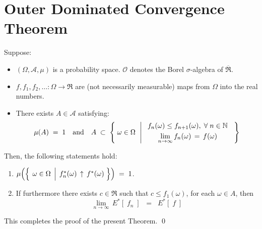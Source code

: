 

\section{Outer Dominated Convergence Theorem}
\setcounter{theorem}{0}
\setcounter{equation}{0}


\renewcommand{\theenumi}{\roman{enumi}}
\renewcommand{\labelenumi}{\textnormal{(\theenumi)}$\;\;$}


\begin{theorem}
\mbox{}\vskip 0.1cm
\noindent
Suppose:
\begin{itemize}
\item
	$(\Omega,\mathcal{A},\mu)$ is a probability space.
	$\mathcal{O}$ denotes the Borel $\sigma$-algebra of $\overline{\Re}$.
\item
	$f, f_{1}, f_{2}, \ldots : \Omega \longrightarrow \Re$ are (not necessarily measurable)
	maps from $\Omega$ into the real numbers.
\item
	There exists $A \in \mathcal{A}$
	satisfying:
	\begin{equation*}
	\mu(A) \;=\; 1
	\quad\textnormal{and}\quad
	A \;\subset\;\left\{\;
		\omega \overset{{\color{white}.}}{\in} \Omega
		\,\;\left\vert\;
		\begin{array}{c}
			f_{n}(\omega) \leq f_{n+1}(\omega),\;\forall\;n\in\N
			\\
			\underset{n\rightarrow\infty}{\lim}\,f_{n}(\omega) \,\overset{{\color{white}+}}{=}\, f(\omega)
		\end{array}
		\right.
		\;\right\}
	\end{equation*}
\end{itemize}
Then, the following statements hold:
\begin{enumerate}
\item
	$\mu\!\left(\left\{\;
			\left.
			\omega \overset{{\color{white}.}}{\in} \Omega
			\,\;\right\vert\;
			f^{*}_{n}(\omega) \,\uparrow\, f^{*}(\omega)
			\;\right\}\right)
	\; = \; 1$.
\item
	If furthermore there exists $c \in \Re$ such that $c \leq f_{1}(\omega)$, for each $\omega \in A$, then
	\begin{equation*}
	\underset{n\rightarrow\infty}{\lim}\,E^{*}\!\left[\;f_{n}\;\right]
	\;\; = \;\; E^{*}\!\left[\;f\;\right]
	\end{equation*}
\end{enumerate}
\end{theorem}
\proof
This completes the proof of the present Theorem.
\qed


\renewcommand{\theenumi}{\roman{enumi}}
\renewcommand{\labelenumi}{\textnormal{(\theenumi)}$\;\;$}

